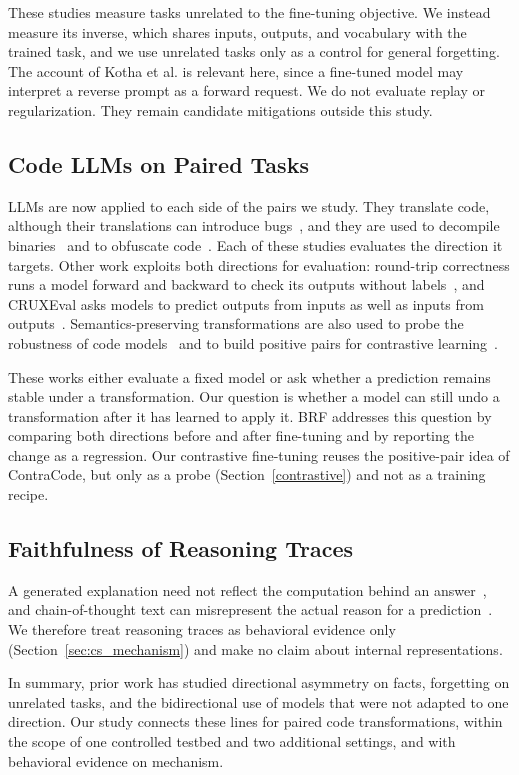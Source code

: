 These studies measure tasks unrelated to the fine-tuning objective.
We instead measure its inverse, which shares inputs, outputs, and vocabulary with the trained task, and we use unrelated tasks only as a control for general forgetting.%
The account of Kotha et al. is relevant here, since a fine-tuned model may interpret a reverse prompt as a forward request.
We do not evaluate replay or regularization. They remain candidate mitigations outside this study.

\subsection{Code LLMs on Paired Tasks}
\label{sec:rw-paired}

LLMs are now applied to each side of the pairs we study.
They translate code, although their translations can introduce bugs~\cite{pan2024lost, yang2024unitrans}, and they are used to decompile binaries~\cite{tan2024llm4decompile, hu2024degpt} and to obfuscate code~\cite{mohseni2025obfuscate}.
Each of these studies evaluates the direction it targets.
Other work exploits both directions for evaluation: round-trip correctness runs a model forward and backward to check its outputs without labels~\cite{allamanis2024roundtrip}, and CRUXEval asks models to predict outputs from inputs as well as inputs from outputs~\cite{gu2024cruxeval}.
Semantics-preserving transformations are also used to probe the robustness of code models~\cite{yefet2020adversarial, rabin2021generalizability} and to build positive pairs for contrastive learning~\cite{jain2021contracode}.

These works either evaluate a fixed model or ask whether a prediction remains stable under a transformation.
Our question is whether a model can still undo a transformation after it has learned to apply it.
BRF addresses this question by comparing both directions before and after fine-tuning and by reporting the change as a regression.
Our contrastive fine-tuning reuses the positive-pair idea of ContraCode, but only as a probe (Section~\ref{contrastive}) and not as a training recipe.

\subsection{Faithfulness of Reasoning Traces}
\label{sec:rw-faithfulness}

A generated explanation need not reflect the computation behind an answer~\cite{jacovi2020faithfulness}, and chain-of-thought text can misrepresent the actual reason for a prediction~\cite{turpin2023unfaithful, lanham2023measuring}.
We therefore treat reasoning traces as behavioral evidence only (Section~\ref{sec:cs_mechanism}) and make no claim about internal representations.

\medskip
In summary, prior work has studied directional asymmetry on facts, forgetting on unrelated tasks, and the bidirectional use of models that were not adapted to one direction.
Our study connects these lines for paired code transformations, within the scope of one controlled testbed and two additional settings, and with behavioral evidence on mechanism.